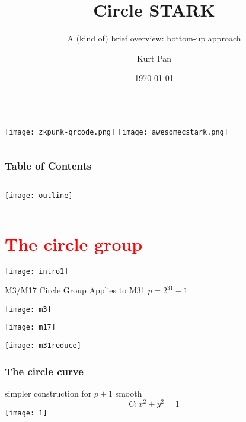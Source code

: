\documentclass{beamer}
\title{Circle STARK}
\subtitle{A (kind of) brief  overview: bottom-up approach}
\author{Kurt Pan}
\institute{\url{ZKPunk.pro}}
\date{\today}
\begin{document}
\begin{frame}
	\titlepage 
	\begin{columns}
	\centering
	\texttt{[image: zkpunk-qrcode.png]}
    \centering
    \texttt{[image: awesomecstark.png]}
 \end{columns}

\end{frame}
  
      	
  

\begin{frame}
\frametitle{Table of Contents}

\begin{columns}
	\tableofcontents
    \centering
      \texttt{[image: outline]}
    
 \end{columns}
\end{frame}

\section{\textcolor{red}{The circle group}}
\begin{frame}
	\texttt{[image: intro1]}
\end{frame}

\begin{frame}{M3/M17 Circle Group}
Applies to M31 $p=2^{31}-1$
    \begin{multicols}{2} %
       \texttt{[image: m3]}

        \texttt{[image: m17]}
    \end{multicols}
\end{frame}
\begin{frame}
\texttt{[image: m31reduce]}
\end{frame}
\begin{frame}
\frametitle{The circle curve}
simpler construction for $p+1$ smooth
$$
C: x^2+y^2=1
$$
\texttt{[image: 1]}


\end{frame}
\end{document}
